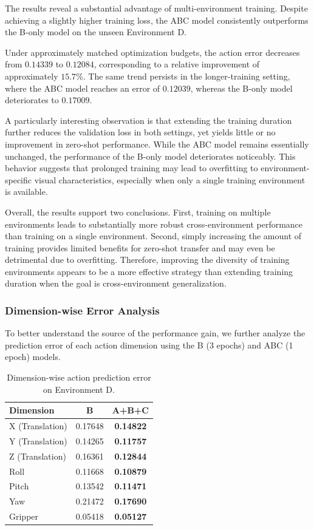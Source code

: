 The results reveal a substantial advantage of multi-environment training. Despite achieving a slightly higher training loss, the ABC model consistently outperforms the B-only model on the unseen Environment D.

Under approximately matched optimization budgets, the action error decreases from $0.14339$ to $0.12084$, corresponding to a relative improvement of approximately $15.7\%$. The same trend persists in the longer-training setting, where the ABC model reaches an error of $0.12039$, whereas the B-only model deteriorates to $0.17009$.

A particularly interesting observation is that extending the training duration further reduces the validation loss in both settings, yet yields little or no improvement in zero-shot performance. While the ABC model remains essentially unchanged, the performance of the B-only model deteriorates noticeably. This behavior suggests that prolonged training may lead to overfitting to environment-specific visual characteristics, especially when only a single training environment is available.

Overall, the results support two conclusions. First, training on multiple environments leads to substantially more robust cross-environment performance than training on a single environment. Second, simply increasing the amount of training provides limited benefits for zero-shot transfer and may even be detrimental due to overfitting. Therefore, improving the diversity of training environments appears to be a more effective strategy than extending training duration when the goal is cross-environment generalization.

\subsubsection{Dimension-wise Error Analysis}

To better understand the source of the performance gain, we further analyze the prediction error of each action dimension using the B (3 epochs) and ABC (1 epoch) models.

\begin{table}[h]
\centering
\caption{Dimension-wise action prediction error on Environment D.}
\label{tab:dimension_error}
\begin{tabular}{lcc}
\toprule
Dimension & B & A+B+C \\
\midrule
X (Translation) & 0.17648 & \textbf{0.14822} \\
Y (Translation) & 0.14265 & \textbf{0.11757} \\
Z (Translation) & 0.16361 & \textbf{0.12844} \\
Roll & 0.11668 & \textbf{0.10879} \\
Pitch & 0.13542 & \textbf{0.11471} \\
Yaw & 0.21472 & \textbf{0.17690} \\
Gripper & 0.05418 & \textbf{0.05127} \\
\bottomrule
\end{tabular}
\end{table}

